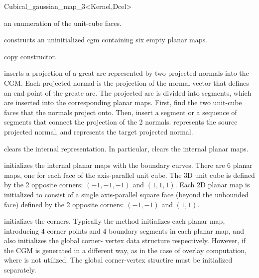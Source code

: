 \begin{ccRefClass}{Cubical_gaussian_map_3<Kernel,Dcel>}
  \ccGlue
  \ccGlue

\ccConstants
{}    
{an enumeration of the unit-cube faces.}

\ccCreation
{}

 {constructs an
uninitialized cgm containing six empty planar maps.}
    
{copy constructor.}

\ccModifiers

{inserts a projection of a great arc represented by two projected normals
 into the CGM. Each projected normal is the projection of the normal vector
 that defines an end point of the greate arc. The projected arc is divided
 into segments, which are inserted into the corresponding planar maps.
 First, find the two unit-cube faces that the normals project onto. Then,
 insert a segment or a sequence of segments that connect the projection of
 the 2 normals.
  represents the source projected normal, and
  represents the target projected normal.}

 {clears the internal representation. In particular, clears the internal planar
  maps.}
 
{initializes the internal planar maps with the boundary curves. There
  are 6 planar maps, one for each face of the axis-parallel unit cube. The 3D
  unit cube is defined by the 2 opposite corners:
  $(-1, -1, -1)$ and $(1, 1, 1)$.
  Each 2D planar map is initialized to consist of a single axis-parallel square
  face (beyond the unbounded face) defined by the 2 opposite corners:
  $(-1,-1)$ and $(1, 1)$.
}
 
{initializes the corners. Typically the  method
  initializes each planar map, introducing 4 corner points and 4 boundary
  segments in each planar map, and also initializes the global corner-
  vertex data structure respectively. However, if the CGM is generated in a
  different way, as in the case of overlay computation, where
   is not utilized. The global corner-vertex structire
  must be initialized separately.
}


\end{ccRefClass}
